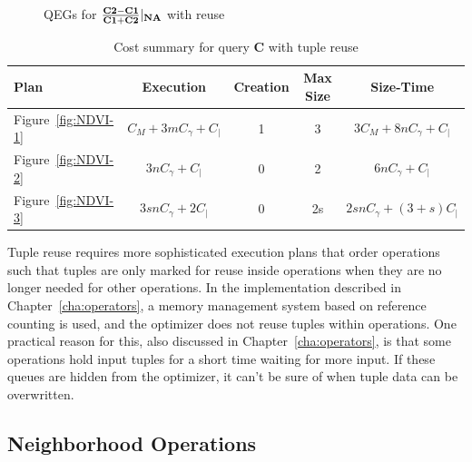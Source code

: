 \documentclass{ucdthesis}       %
\newcommand{\qry}[1]{{\bf #1}}
\begin{document}
\begin{figure}[htb]
  \centering
  \subfigure[No optimizations]{
     \scalebox{0.82}{}
  }
  \caption{\acp{QEG} for $\frac{{\bf{C2}}-{\bf{C1}}}{{\bf{C1}}+{\bf{C2}}}|_{{\bf{NA}}}$ with reuse}
  \label{fig:NDVI-r}
\end{figure}
%
\begin{table}
  \centering

  \caption{Cost summary for query \qry{C} with tuple reuse}
  \begin{tabular}{l|c|c|c|c}
    Plan & Execution & Creation & Max Size & Size-Time \\
    \hline \hline
    Figure~\ref{fig:NDVI-1} & $C_{M} + 3 m C_{\gamma} + C_{|}$ & 1 & 3 & $3 C_{M} + 8 n C_{\gamma} + C_{|}$ \\
    Figure~\ref{fig:NDVI-2} & $3 n C_{\gamma} + C_{|}$ & 0 & 2 & $6 n C_{\gamma} + C_{|}$ \\
    Figure~\ref{fig:NDVI-3} & $3 s n C_{\gamma} + 2 C_{|}$ & 0 & 2s & $2 s n C_{\gamma} + (3+s) C_{|}$ 
  \end{tabular}
  \label{tab:ndvi-summary-r}
\end{table}

Tuple reuse requires more sophisticated execution plans that order
operations such that tuples are only marked for reuse inside
operations when they are no longer needed for other operations.  In
the implementation described in Chapter~\ref{cha:operators}, a memory
management system based on reference counting is used, and the
optimizer does not reuse tuples within operations.  One practical
reason for this, also discussed in Chapter~\ref{cha:operators}, is
that some operations hold input tuples for a short time waiting for
more input.  If these queues are hidden from the optimizer, it can't
be sure of when tuple data can be overwritten.

\subsection{Neighborhood Operations}
\label{sec:nbr-opt}
\end{document}
